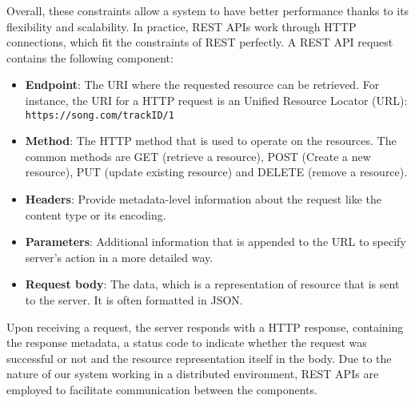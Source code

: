 Overall, these constraints allow a system to have better performance thanks to its flexibility and scalability. In practice, REST APIs work through HTTP connections, which fit the constraints of REST perfectly. A REST API request contains the following component:

\begin{itemize}
    \item \textbf{Endpoint}: The URI where the requested resource can be retrieved. For instance, the URI for a HTTP request is an Unified Resource Locator (URL): \nolinkurl{https://song.com/trackID/1}
    \item \textbf{Method}: The HTTP method that is used to operate on the resources. The common methods are GET (retrieve a resource), POST (Create a new resource), PUT (update existing resource) and DELETE (remove a resource).
    \item \textbf{Headers}: Provide metadata-level information about the request like the content type or its encoding.
    \item \textbf{Parameters}: Additional information that is appended to the URL to specify server's action in a more detailed way.
    \item \textbf{Request body}: The data, which is a representation of resource that is sent to the server. It is often formatted in JSON.
\end{itemize}

Upon receiving a request, the server responds with a HTTP response, containing the response metadata, a status code to indicate whether the request was successful or not and the resource representation itself in the body. Due to the nature of our system working in a distributed environment, REST APIs are employed to facilitate communication between the components.